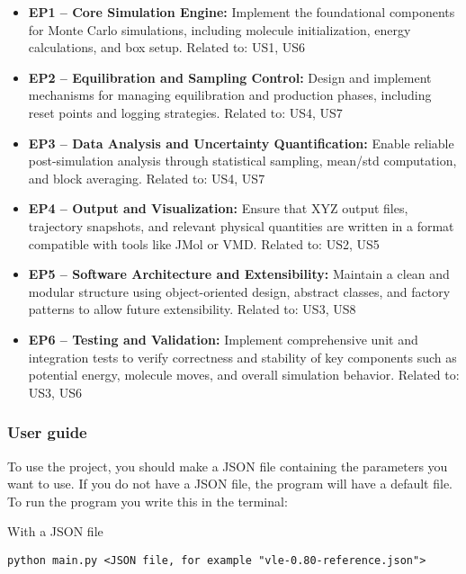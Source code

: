 \documentclass{article}
\begin{document}
\begin{itemize}
    \item \textbf{EP1 – Core Simulation Engine:} Implement the foundational components for Monte Carlo simulations, including molecule initialization, energy calculations, and box setup. Related to: US1, US6
    
    \item \textbf{EP2 – Equilibration and Sampling Control:} Design and implement mechanisms for managing equilibration and production phases, including reset points and logging strategies. Related to: US4, US7
    
    \item \textbf{EP3 – Data Analysis and Uncertainty Quantification:} Enable reliable post-simulation analysis through statistical sampling, mean/std computation, and block averaging. Related to: US4, US7
    
    \item \textbf{EP4 – Output and Visualization:} Ensure that XYZ output files, trajectory snapshots, and relevant physical quantities are written in a format compatible with tools like JMol or VMD. Related to: US2, US5
    
    \item \textbf{EP5 – Software Architecture and Extensibility:} Maintain a clean and modular structure using object-oriented design, abstract classes, and factory patterns to allow future extensibility. Related to: US3, US8
    
    \item \textbf{EP6 – Testing and Validation:} Implement comprehensive unit and integration tests to verify correctness and stability of key components such as potential energy, molecule moves, and overall simulation behavior. Related to: US3, US6
\end{itemize}

\subsubsection*{User guide}

To use the project, you should make a JSON file containing the parameters you want to use. If you do not have a JSON file, the program will have a default file. To run the program you write this in the terminal:

With a JSON file

\begin{verbatim}
python main.py <JSON file, for example "vle-0.80-reference.json">
\end{verbatim}
\end{document}
